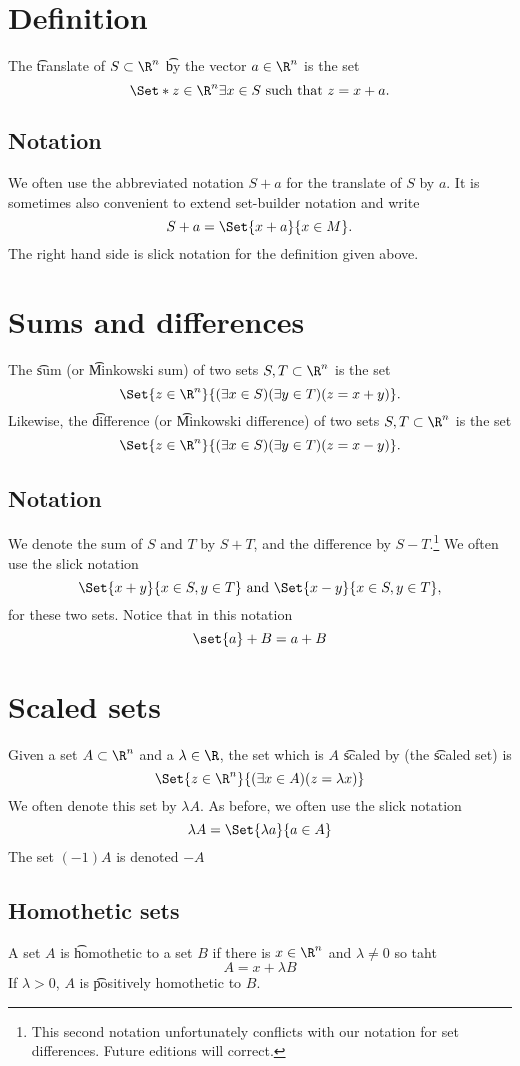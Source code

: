
\section*{Definition}

The \t{translate} of $S \subset \R ^n$ \t{by} the vector $a \in \R ^n$ is the set
\[
\Set*{z \in \R ^n}{\exists x \in S \text{ such that } z = x + a}.
\]

\subsection*{Notation}

We often use the abbreviated notation $S + a$ for the translate of $S$ by $a$.
It is sometimes also convenient to extend set-builder notation and write
\[
S + a = \Set{x + a}{x \in M}.
\]
The right hand side is slick notation for the definition given above.

\section*{Sums and differences}

The \t{sum} (or \t{Minkowski sum}) of two sets $S, T \subset \R ^n$ is the set
\[
\Set{z \in \R ^n}{(\exists x \in S)(\exists y \in T)(z = x + y)}.
\]
Likewise, the \t{difference} (or \t{Minkowski difference}) of two sets $S, T \subset \R ^n$ is the set
\[
\Set{z \in \R ^n}{(\exists x \in S)(\exists y \in T)(z = x - y)}.
\]

\subsection*{Notation}

We denote the sum of $S$ and $T$ by $S + T$, and the difference by $S - T$.\footnote{This second notation unfortunately conflicts with our notation for set differences.
Future editions will correct.}
We often use the slick notation
\[
\Set{x + y}{x \in S, y \in T} \text{ and } \Set{x - y}{x \in S, y \in T},
\]
for these two sets.
Notice that in this notation
\[
\set{a} + B = a + B
\]

\section*{Scaled sets}

Given a set $A \subset \R ^n$ and a $\lambda  \in \R $, the set which is $A$ \t{scaled by} (the \t{scaled set}) is
\[
\Set{z \in \R ^n}{(\exists x \in A)(z = \lambda x)}
\]
We often denote this set by $\lambda A$.
As before, we often use the slick notation
\[
\lambda A = \Set{\lambda a}{a \in A}
\]
The set $(-1)A$ is denoted $-A$

\subsection*{Homothetic sets}

A set $A$ is \t{homothetic} to a set $B$ if there is $x \in \R ^n$ and $\lambda  \neq 0$ so taht
\[
A = x + \lambda B
\]
If $\lambda  > 0$, $A$ is \t{positively homothetic} to $B$.

\blankpage